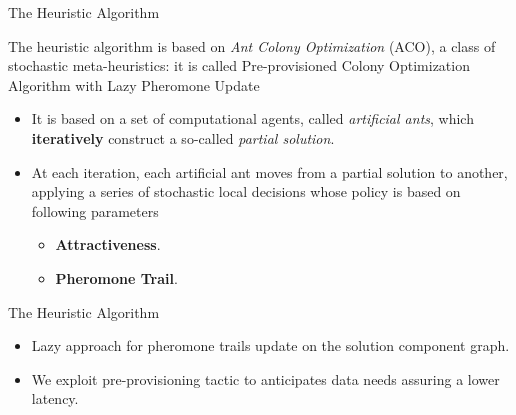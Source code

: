 \documentclass[13.5pt]{beamer}
\newcommand{\B}[1]{\textcolor{TorVergataColor}{\textbf{#1}}}
\begin{document}
\begin{frame}{The Heuristic Algorithm}
	
	\begin{block}{}
		\centering
		The heuristic algorithm is based on \textit{Ant Colony Optimization} (ACO), a class of stochastic meta-heuristics: it is called Pre-provisioned Colony Optimization Algorithm with Lazy Pheromone Update
	\end{block}
	
	\begin{itemize}
		\item It is based on a set of computational agents, called \textit{artificial ants}, which \B{iteratively} construct a so-called \textit{partial solution}.
		
		\vspace{\baselineskip}
		
		\item At each iteration, each artificial ant moves from a partial solution to another, applying a series of stochastic local decisions whose policy is based on following parameters
		
		\begin{itemize}
			\item \textbf{Attractiveness}.
			\item \textbf{Pheromone Trail}.
		\end{itemize}
		
	\end{itemize}
	
	
	
	
\end{frame}
\begin{frame}{The Heuristic Algorithm}
	
	\begin{itemize}
		\item Lazy approach for pheromone trails update on the solution component graph.
		
		\item We exploit pre-provisioning tactic to anticipates data needs assuring a lower latency.
	\end{itemize}



\end{frame}
\end{document}
